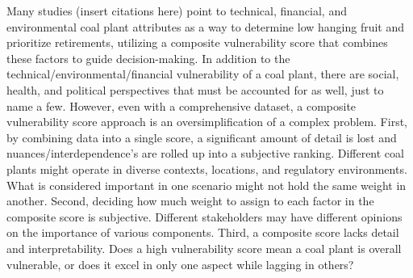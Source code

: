 Many studies (insert citations here) point to technical, financial, and environmental 
coal plant attributes as a way to determine low hanging fruit and prioritize retirements, utilizing a composite vulnerability score that combines these factors to guide 
decision-making. In addition to the technical/environmental/financial vulnerability of a coal plant, there are social, health, and political perspectives that must be accounted for as well, just 
to name a few. However, even with a comprehensive dataset, a composite vulnerability score approach is an oversimplification of a complex problem.
First, by combining data into a single score, a significant amount of detail is lost and nuances/interdependence's are rolled up into a subjective 
ranking. Different coal plants might operate in diverse contexts, locations, and regulatory environments. What is considered important in 
one scenario might not hold the same weight in another. Second, deciding how much weight to assign to each factor in the composite score is subjective. Different stakeholders may have 
different opinions on the importance of various components. Third, a composite score lacks detail and interpretability. Does a high vulnerability score mean a coal plant is 
overall vulnerable, or does it excel in only one aspect while lagging in others?




